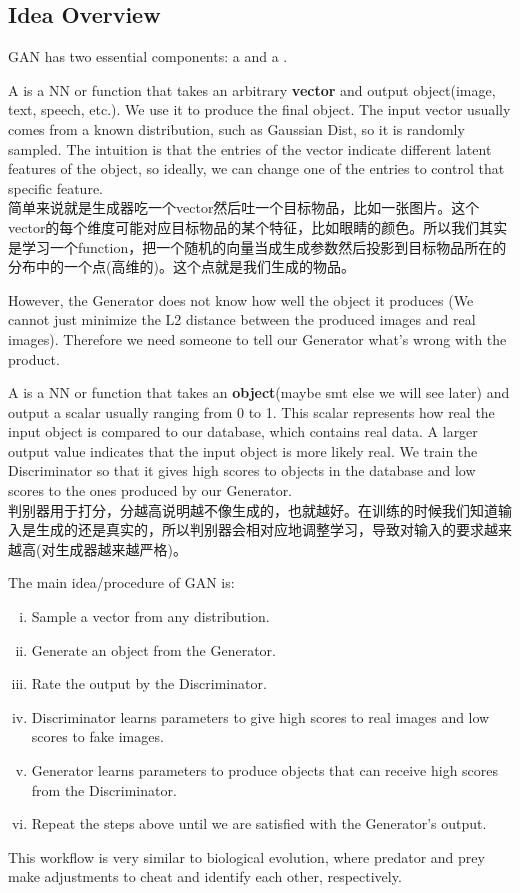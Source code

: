 \documentclass{../templates/ainote}
\begin{document}
\subsection{Idea Overview}
GAN has two essential components: a  and a .
\begin{info}
    A  is a NN or function that takes an arbitrary \textbf{vector} and output object(image, text, speech, etc.). We use it to produce the final object.
    The input vector usually comes from a known distribution, such as Gaussian Dist, so it is randomly sampled. The intuition is that the entries of the vector indicate different latent features of the object, so ideally, we can change one of the entries to control that specific feature.\\
    简单来说就是生成器吃一个vector然后吐一个目标物品，比如一张图片。这个vector的每个维度可能对应目标物品的某个特征，比如眼睛的颜色。所以我们其实是学习一个function，把一个随机的向量当成生成参数然后投影到目标物品所在的分布中的一个点(高维的)。这个点就是我们生成的物品。
\end{info}
However, the Generator does not know how well the object it produces (We cannot just minimize the L2 distance between the produced images and real images). Therefore we need someone to tell our Generator what's wrong with the product.
\begin{info}
    A  is a NN or function that takes an \textbf{object}(maybe smt else we will see later) and output a scalar usually ranging from 0 to 1. This scalar represents how real the input object is compared to our database, which contains real data.
    A larger output value indicates that the input object is more likely real. We train the Discriminator so that it gives high scores to objects in the database and low scores to the ones produced by our Generator.\\
    判别器用于打分，分越高说明越不像生成的，也就越好。在训练的时候我们知道输入是生成的还是真实的，所以判别器会相对应地调整学习，导致对输入的要求越来越高(对生成器越来越严格)。
\end{info}
The main idea/procedure of GAN is:
\begin{enumerate}[i.]
    \item Sample a vector from any distribution.
    \item Generate an object from the Generator.
    \item Rate the output by the Discriminator.
    \item Discriminator learns parameters to give high scores to real images and low scores to fake images.
    \item Generator learns parameters to produce objects that can receive high scores from the Discriminator.
    \item Repeat the steps above until we are satisfied with the Generator's output.
\end{enumerate}
This workflow is very similar to biological evolution, where predator and prey make adjustments to cheat and identify each other, respectively.
\end{document}
